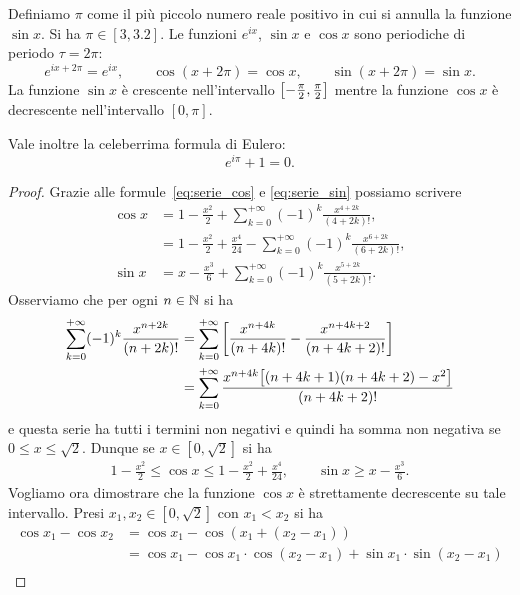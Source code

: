 \begin{theorem}[definizione di $\pi$]
%
%
\label{th:pi}%
\mynote{$\pi$}%
Definiamo $\pi$ come il più piccolo numero reale
positivo in cui si annulla la funzione $\sin x$.
Si ha $\pi \in [3,3.2]$.
Le funzioni $e^{ix}$, $\sin x$ e $\cos x$ sono
periodiche di periodo $\tau = 2\pi$:
\mynote{$\tau$}%
\[
  e^{ix+2\pi} = e^{ix}, \qquad
  \cos(x + 2\pi) = \cos x, \qquad
  \sin(x + 2\pi) = \sin x.
\]
La funzione $\sin x$ è crescente nell'intervallo
${\left[ -\frac \pi 2,\frac \pi 2 \right]}$ mentre
la funzione $\cos x$ è decrescente nell'intervallo $[0,\pi]$.

Vale inoltre la celeberrima formula di Eulero:
\[
  e^{i\pi} + 1 = 0.
\]
\end{theorem}
\begin{proof}
Grazie alle formule~\eqref{eq:serie_cos} e \eqref{eq:serie_sin}
possiamo scrivere
\begin{align*}
\cos x &= 1 - \frac{x^2}{2}
+ \sum_{k=0}^{+\infty} (-1)^k\frac{x^{4+2k}}{(4+2k)!}, \\
  &= 1 - \frac{x^2}{2} + \frac{x^4}{24}
  - \sum_{k=0}^{+\infty} (-1)^k\frac{x^{6+2k}}{(6+2k)!}, \\
\sin x &= x - \frac{x^3}{6} + \sum_{k=0}^{+\infty} (-1)^k \frac{x^{5+2k}}{(5+2k)!}.
\end{align*}
Osserviamo che per ogni $n\in \mathbb N$ si ha
\begin{align*}
  \sum_{k=0}^{+\infty}(-1)^k \frac{x^{n+2k}}{(n+2k)!}
  &= \sum_{k=0}^{+\infty}{\left[ \frac{x^{n+4k}}{(n+4k)!}
    - \frac{x^{n+4k+2}}{(n+4k+2)!} \right]}\\
  &= \sum_{k=0}^{+\infty}\frac{x^{n+4k}{\left[ (n+4k+1)(n+4k+2) - x^2 \right]}}{(n+4k+2)!}
\end{align*}
e questa serie ha tutti i termini non negativi
e quindi ha somma non negativa se $0 \le x \le \sqrt 2$.
Dunque se $x\in [0,\sqrt 2]$ si ha
\begin{align*}
1 - \frac{x^2}{2}
\le  \cos x \le 1 - \frac{x^2}{2} + \frac{x^4}{24},
\qquad
  \sin x \ge x - \frac{x^3}{6}.
\end{align*}
Vogliamo ora dimostrare che la funzione
$\cos x$ è strettamente decrescente su tale intervallo.
Presi $x_1,x_2\in[0,\sqrt 2]$ con $x_1<x_2$
si ha
\begin{align*}
\cos x_1 - \cos x_2
&= \cos x_1 - \cos (x_1+(x_2-x_1)) \\
&= \cos x_1 - \cos x_1 \cdot \cos(x_2-x_1) + \sin x_1 \cdot \sin (x_2-x_1)\\

\end{align*}
\end{proof}
